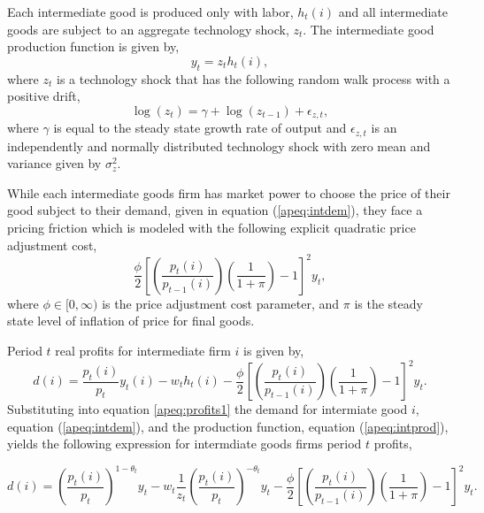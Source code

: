 \documentclass[12pt]{article}
\newcommand{\beq}{\begin{equation}}
\newcommand{\eeq}{\end{equation}}
\begin{document}
Each intermediate good is produced only with labor, $h_t(i)$ and all intermediate goods are subject to an aggregate technology shock, $z_t$.  The intermediate good production function is given by,
\beq \label{apeq:intprod} y_t = z_t h_t(i), \eeq
where $z_t$ is a technology shock that has the following random walk process with a positive drift,
\beq \label{apeq:tech} \log(z_t) = \gamma + \log(z_{t-1}) + \epsilon_{z,t}, \eeq
where $\gamma$ is equal to the steady state growth rate of output and $\epsilon_{z,t}$ is an independently and normally distributed technology shock with zero mean and variance given by $\sigma_z^2$.

While each intermediate goods firm has market power to choose the price of their good subject to their demand, given in equation (\ref{apeq:intdem}), they face a pricing friction which is modeled with the following explicit quadratic price adjustment cost,
\beq \frac{\phi}{2} \left[ \left(\frac{p_t(i)}{p_{t-1}(i)}\right) \left(\frac{1}{1+\pi}\right) - 1\right]^2 y_t, \eeq
where $\phi\in[0,\infty)$ is the price adjustment cost parameter, and $\pi$ is the steady state level of inflation of price for final goods.

Period $t$ real profits for intermediate firm $i$ is given by,
\beq \label{apeq:profits1} d(i) = \frac{p_t(i)}{p_t} y_t(i) - w_t h_t(i) - \frac{\phi}{2} \left[ \left(\frac{p_t(i)}{p_{t-1}(i)}\right) \left(\frac{1}{1+\pi}\right) - 1\right]^2 y_t. \eeq
Substituting into equation \ref{apeq:profits1} the demand for intermiate good $i$, equation (\ref{apeq:intdem}), and the production function, equation (\ref{apeq:intprod}), yields the following expression for intermdiate goods firms period $t$ profits,

\beq \label{apeq:profits2} d(i) = \left(\frac{p_t(i)}{p_t}\right)^{1-\theta_t} y_t - w_t \frac{1}{z_t} \left(\frac{p_t(i)}{p_t}\right)^{-\theta_t} y_t - \frac{\phi}{2} \left[ \left(\frac{p_t(i)}{p_{t-1}(i)}\right) \left(\frac{1}{1+\pi}\right) - 1\right]^2 y_t. \eeq
\end{document}
